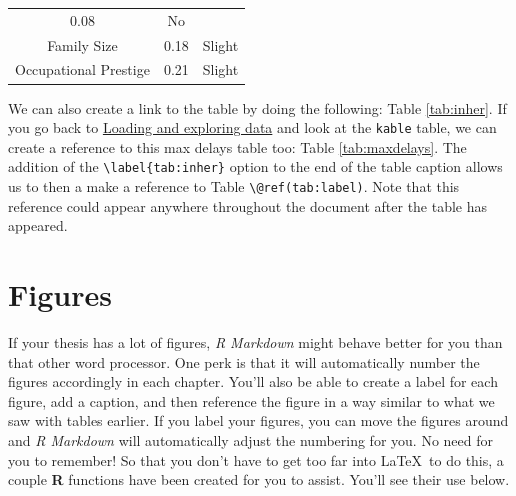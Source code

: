 \documentclass[12pt,twoside]{reedthesis}
\begin{document}
\begin{longtable}[]{@{}ccc@{}}
\begin{minipage}[t]{0.47\columnwidth}
  0.08
  \strut\end{minipage} &
  \begin{minipage}[t]{0.16\columnwidth}\centering\strut
  No
  \strut\end{minipage}\tabularnewline
  \begin{minipage}[t]{0.29\columnwidth}\centering\strut
  Family Size
  \strut\end{minipage} &
  \begin{minipage}[t]{0.47\columnwidth}\centering\strut
  0.18
  \strut\end{minipage} &
  \begin{minipage}[t]{0.16\columnwidth}\centering\strut
  Slight
  \strut\end{minipage}\tabularnewline
  \begin{minipage}[t]{0.29\columnwidth}\centering\strut
  Occupational Prestige
  \strut\end{minipage} &
  \begin{minipage}[t]{0.47\columnwidth}\centering\strut
  0.21
  \strut\end{minipage} &
  \begin{minipage}[t]{0.16\columnwidth}\centering\strut
  Slight
  \strut\end{minipage}\tabularnewline
  \bottomrule
  \end{longtable}
  
  We can also create a link to the table by doing the following: Table
  \ref{tab:inher}. If you go back to
  \protect\hyperlink{loading-and-exploring-data}{Loading and exploring
  data} and look at the \texttt{kable} table, we can create a reference to
  this max delays table too: Table \ref{tab:maxdelays}. The addition of
  the \texttt{\textbackslash{}label\{tab:inher\}} option to the end of the
  table caption allows us to then a make a reference to Table
  \texttt{\textbackslash{}@ref(tab:label)}. Note that this reference could
  appear anywhere throughout the document after the table has appeared.
  
  \clearpage
  
  \section{Figures}\label{figures}
  
  If your thesis has a lot of figures, \emph{R Markdown} might behave
  better for you than that other word processor. One perk is that it will
  automatically number the figures accordingly in each chapter. You'll
  also be able to create a label for each figure, add a caption, and then
  reference the figure in a way similar to what we saw with tables
  earlier. If you label your figures, you can move the figures around and
  \emph{R Markdown} will automatically adjust the numbering for you. No
  need for you to remember! So that you don't have to get too far into
  \LaTeX~to do this, a couple \textbf{R} functions have been created for
  you to assist. You'll see their use below.
  
\end{document}
